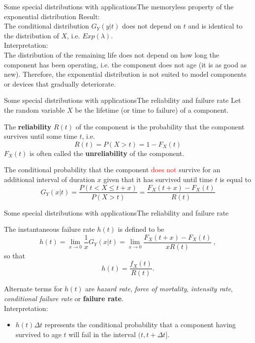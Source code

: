 \documentclass[handout]{beamer}
\begin{document}
\begin{frame}{Some special distributions with applications}{The memoryless property of the exponential distribution}
Result:\\
The conditional distribution $G_Y(y\rvert t)$ does not depend on $t$ and is identical to the distribution of $X$, i.e. 
$Exp(\lambda)$.\\
\vspace{1cm}
Interpretation:\\
The distribution of the remaining life does not depend on how long the component has been operating, i.e. the component 
does not age (it is as good as new). Therefore, the exponential distribution is not suited to model components or devices
that gradually deteriorate.  

\end{frame}

\begin{frame}{Some special distributions with applications}{The reliability and failure rate}
Let the random variable $X$ be the lifetime (or time to failure) of a component.
\begin{definition}
 The \textbf{reliability} $R(t)$ of the component is the probability that the component survives until some time $t$, i.e. 
\[
 R(t) = P(X>t) = 1-F_X(t)
\]
$F_X(t)$ is often called the \textbf{unreliability} of the component.
\end{definition}
The conditional probability that the component  \textcolor{red}{does not} survive for an additional interval of duration $x$ 
given that it has survived until time $t$ is equal to
\[
 G_Y(x \rvert t) = \frac{P(t< X \leq t+x)}{P(X>t)} = \frac{F_X(t+x) - F_X(t)}{R(t)}
\]
\end{frame}

\begin{frame}{Some special distributions with applications}{The reliability and failure rate}
\begin{definition}
The instantaneous failure rate $h(t)$ is defined to be
\[
 h(t) = \lim_{x \rightarrow 0} \frac{1}{x} G_Y(x \rvert t) = \lim_{x \rightarrow 0} \frac{F_X(t+x) - F_X(t)}{xR(t)} \ ,
\]
so that
\[
 h(t) = \frac{f_X(t)}{R(t)}.
\]
\end{definition}
Alternate terms for $h(t)$ are \textit{hazard rate}, \textit{force of mortality}, \textit{intensity rate}, 
\textit{conditional failure rate} or \textbf{failure rate}.\\
Interpretation:
\begin{itemize}
 \item $h(t)\Delta t$ represents the conditional probability that a component having survived to age $t$ will 
fail in the interval $(t,t+\Delta t]$.
\end{itemize}
\end{frame}
\end{document}

